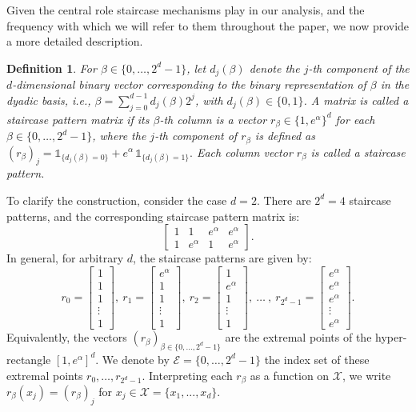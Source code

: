 \documentclass[a4paper, 11pt]{article}
\newtheorem{df}{Definition}
\theoremstyle{definition}
\newcommand{\indi}[1]{\mathds{1}_{#1}}
\begin{document}
{Given the central role staircase mechanisms play in our analysis, and the frequency with which we will refer to them throughout the paper, we now provide a more detailed description.

\begin{df}\label{def: staircase matrix}
For $\beta \in \{0, \dots, 2^d - 1\}$, let $d_j(\beta)$ denote the $j$-th component of the $d$-dimensional binary vector corresponding to the binary representation of $\beta$ in the dyadic basis, i.e., $\beta = \sum_{j=0}^{d-1} d_j(\beta) 2^j$, with $d_j(\beta) \in \{0, 1\}$.
A matrix is called a staircase pattern matrix if its $\beta$-th column is a vector $r_\beta \in \{1, e^\alpha\}^d$ for each $\beta \in \{0, \dots, 2^d - 1\}$, where the $j$-th component of $r_\beta$ is defined as
$(r_\beta)_j = \indi{\{d_j(\beta) = 0\}} + e^\alpha \, \indi{\{d_j(\beta) = 1\}}.$
Each column vector $r_\beta$ is called a staircase pattern.
\end{df}

To clarify the construction, consider the case $d = 2$. There are $2^d = 4$ staircase patterns, and the corresponding staircase pattern matrix is:
$$
\begin{bmatrix}
1 & 1 & e^\alpha & e^\alpha \\
1 & e^\alpha & 1 & e^\alpha
\end{bmatrix}.
$$
In general, for arbitrary $d$, the staircase patterns are given by:
\begin{equation}\label{eq : R matrix by slice}
	r_0=\begin{bmatrix} 1\\1\\ 1\\ \vdots\\ 1\end{bmatrix},~
	r_1=\begin{bmatrix} e^\alpha\\1 \\ 1\\ \vdots\\ 1\end{bmatrix},~
	r_2=\begin{bmatrix} 1 \\ e^\alpha\\ 1\\ \vdots\\ 1\end{bmatrix},~\dots~,~
	r_{2^d-1}=\begin{bmatrix} e^\alpha \\ e^\alpha\\ e^\alpha\\ \vdots\\ e^\alpha\end{bmatrix}.
\end{equation}
Equivalently, the vectors $(r_\beta)_{\beta \in \{0, \dots, 2^d - 1\}}$ are the extremal points of the hyper-rectangle $[1, e^\alpha]^d$.
We denote by $\mathcal{E} = \{0, \dots, 2^d - 1\}$ the index set of these extremal points ${r_0, \dots, r_{2^d - 1}}$.
Interpreting each $r_\beta$ as a function on $\mathcal{X}$, we write $r_\beta(x_j) = (r_\beta)_j$ for $x_j \in \mathcal{X}= \{ x_1, ... , x_d \}$. 

}
\end{document}
